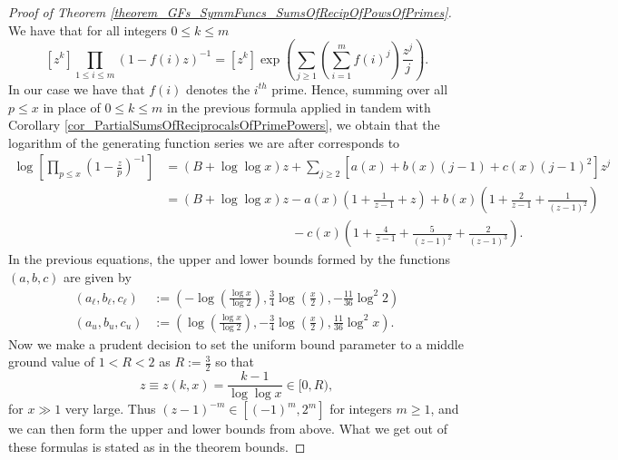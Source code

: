 \documentclass[11pt,reqno,a4letter]{article}
\numberwithin{figure}{section}
\numberwithin{table}{section}
\theoremstyle{plain}
\numberwithin{theorem}{section}
\theoremstyle{definition}
\newcommand{\NBRef}[1]{
     \todo[linecolor=green!85!white,backgroundcolor=orange!50!white,bordercolor=blue!30!black,textcolor=cyan!15!black,shadow,size=\small,fancyline]{
     \color{NBRefColor}{\textbf{#1}
     }
     }
}
\begin{document}
\NBRef{A06-2020-04-26} 
\begin{proof}[Proof of Theorem \ref{theorem_GFs_SymmFuncs_SumsOfRecipOfPowsOfPrimes}] 
We have that for all integers $0 \leq k \leq m$
\[
[z^k] \prod_{1 \leq i \leq m} (1-f(i) z)^{-1} = [z^k] \exp\left(\sum_{j \geq 1} 
     \left(\sum_{i=1}^m f(i)^j\right) \frac{z^j}{j}\right). 
\]
In our case we have that $f(i)$ denotes the $i^{th}$ prime. Hence, summing over all $p \leq x$ 
in place of $0 \leq k \leq m$ in the previous formula applied in tandem with 
Corollary \ref{cor_PartialSumsOfReciprocalsOfPrimePowers}, we obtain that the logarithm of the 
generating function series we are after corresponds to 
\begin{align*} 
\log\left[\prod_{p \leq x} \left(1-\frac{z}{p}\right)^{-1}\right] & = (B + \log\log x) z + 
     \sum_{j \geq 2} \left[a(x) + b(x)(j-1) + c(x) (j-1)^2\right] z^j \\ 
     & = (B + \log\log x) z - a(x) \left(1 + \frac{1}{z-1} + z\right) + b(x) \left( 
     1 + \frac{2}{z-1} + \frac{1}{(z-1)^2}\right) \\ 
     & \phantom{= (B + \log\log x) z\ } - 
     c(x) \left( 
     1 + \frac{4}{z-1} + \frac{5}{(z-1)^2} + \frac{2}{(z-1)^3}\right). 
\end{align*} 
In the previous equations, the upper and lower bounds formed by the functions $(a,b,c)$ are 
given by 
\begin{align*} 
(a_{\ell}, b_{\ell}, c_{\ell}) & := \left(-\log\left(\frac{\log x}{\log 2}\right), 
     \frac{3}{4} \log\left(\frac{x}{2}\right), - \frac{11}{36} \log^2 2\right) \\ 
(a_u, b_u, c_u) & := \left(\log\left(\frac{\log x}{\log 2}\right), 
     -\frac{3}{4} \log\left(\frac{x}{2}\right), \frac{11}{36} \log^2 x\right). 
\end{align*} 
Now we make a prudent decision to set the uniform bound parameter to a middle ground value of 
$1 < R < 2$ as $R := \frac{3}{2}$ so that 
$$z \equiv z(k, x) = \frac{k-1}{\log\log x} \in [0, R),$$ for $x \gg 1$ very large. 
Thus $(z-1)^{-m} \in [(-1)^m, 2^m]$ for integers $m \geq 1$, and we can then form the upper and 
lower bounds from above. What we get out of these formulas is stated as in the theorem bounds. 
\end{proof} 
\end{document}
